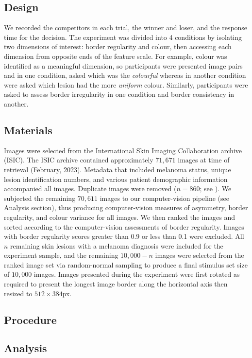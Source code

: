 \documentclass[a4paper, natbib, doc, 12pt]{apa7}
\begin{document}
\subsection{Design}
We recorded the competitors in each trial, the winner and loser, and the response time for the decision. The experiment was divided into 4 conditions by isolating two dimensions of interest: border regularity and colour, then accessing each dimension from opposite ends of the feature scale. For example, colour was identified as a meaningful dimension, so participants were presented image pairs and in one condition, asked which was the \textit{colourful} whereas in another condition were asked which lesion had the more \textit{uniform} colour. Similarly, participants were asked to assess border irregularity in one condition and border consistency in another.
\
\subsection{Materials}
Images were selected from the International Skin Imaging Collaboration archive (ISIC). The ISIC archive contained approximately $71, 671$ images at time of retrieval (February, 2023). Metadata that included melanoma status, unique lesion identification numbers, and various patient demographic information accompanied all images. Duplicate images were removed ($n = 860$; see \cite{cassidy2022analysis}). We subjected the remaining $70, 611$ images to our computer-vision pipeline (see Analysis section), thus producing computer-vision measures of asymmetry, border regularity, and colour variance for all images. We then ranked the images and sorted according to the computer-vision assessments of border regularity. Images with border regularity scores greater than 0.9 or less than 0.1 were excluded. All $n$ remaining skin lesions with a melanoma diagnosis were included for the experiment sample, and the remaining $10,000 - n$ images were selected from the ranked image set via random-normal sampling to produce a final stimulus set size of $10, 000$ images. Images presented during the experiment were first rotated as required to present the longest image border along the horizontal axis then resized to $512\times384$px. 

\subsection{Procedure}

\subsection{Analysis}
\end{document}
